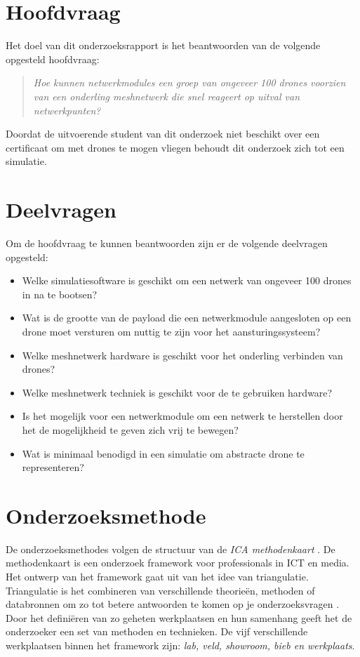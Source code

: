 \documentclass[a4paper, 11pt, oneside]{report}
\begin{document}
\section{Hoofdvraag}
Het doel van dit onderzoeksrapport is het beantwoorden van de volgende opgesteld hoofdvraag:
\begin{quotation}
\textit{Hoe kunnen netwerkmodules een groep van ongeveer 100 drones voorzien van een onderling meshnetwerk die snel reageert op uitval van netwerkpunten?}	
\end{quotation}
Doordat de uitvoerende student van dit onderzoek niet beschikt over een certificaat om met drones te mogen vliegen behoudt dit onderzoek zich tot een simulatie.


\section{Deelvragen}

Om de hoofdvraag te kunnen beantwoorden zijn er de volgende deelvragen opgesteld:

\begin{itemize}
	\item Welke simulatiesoftware is geschikt om een netwerk van ongeveer 100 drones in na te bootsen?
	\item Wat is de grootte van de payload die een netwerkmodule aangesloten op een drone moet versturen om nuttig te zijn voor het aansturingssysteem?
	\item Welke meshnetwerk hardware is geschikt voor het onderling verbinden van drones?
	\item Welke meshnetwerk techniek is geschikt voor de te gebruiken hardware?
	\item Is het mogelijk voor een netwerkmodule om een netwerk te herstellen door het de mogelijkheid te geven zich vrij te bewegen?
	\item Wat is minimaal benodigd in een simulatie om abstracte drone te representeren?
\end{itemize}

\section{Onderzoeksmethode}
De onderzoeksmethodes volgen de structuur van de \textit{ICA methodenkaart} \cite{MethodenKaart}.
De methodenkaart is een onderzoek framework voor professionals in ICT en media.
Het ontwerp van het framework gaat uit van het idee van triangulatie.
Triangulatie is het combineren van verschillende theorieën, methoden of databronnen om zo tot betere antwoorden te komen op je onderzoeksvragen \cite{ICAoates}. 
Door het definiëren van zo geheten werkplaatsen en hun samenhang geeft het de onderzoeker een set van methoden en technieken. 
De vijf verschillende werkplaatsen binnen het framework zijn: \textit{lab, veld, showroom, bieb en werkplaats}.
\end{document}
